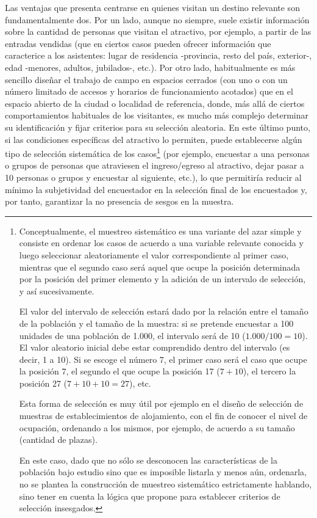 \documentclass[
]{book}
\begin{document}
Las ventajas que presenta centrarse en quienes visitan un destino relevante son fundamentalmente dos. Por un lado, aunque no siempre, suele existir información sobre la cantidad de personas que visitan el atractivo, por ejemplo, a partir de las entradas vendidas (que en ciertos casos pueden ofrecer información que caracterice a los asistentes: lugar de residencia -provincia, resto del país, exterior-, edad -menores, adultos, jubilados-, etc.). Por otro lado, habitualmente es más sencillo diseñar el trabajo de campo en espacios cerrados (con uno o con un número limitado de accesos y horarios de funcionamiento acotados) que en el espacio abierto de la ciudad o localidad de referencia, donde, más allá de ciertos comportamientos habituales de los visitantes, es mucho más complejo determinar su identificación y fijar criterios para su selección aleatoria. En este último punto, si las condiciones específicas del atractivo lo permiten, puede establecerse algún tipo de selección sistemática de los casos\footnote{Conceptualmente, el muestreo sistemático es una variante del azar simple y consiste en ordenar los casos de acuerdo a una variable relevante conocida y luego seleccionar aleatoriamente el valor correspondiente al primer caso, mientras que el segundo caso será aquel que ocupe la posición determinada por la posición del primer elemento y la adición de un intervalo de selección, y así sucesivamente.

  El valor del intervalo de selección estará dado por la relación entre el tamaño de la población y el tamaño de la muestra: si se pretende encuestar a 100 unidades de una población de 1.000, el intervalo será de 10 (\(1.000/100=10\)). El valor aleatorio inicial debe estar comprendido dentro del intervalo (es decir, 1 a 10). Si se escoge el número 7, el primer caso será el caso que ocupe la posición 7, el segundo el que ocupe la posición 17 (\(7+10\)), el tercero la posición 27 (\(7+10+10=27\)), etc.

  Esta forma de selección es muy útil por ejemplo en el diseño de selección de muestras de establecimientos de alojamiento, con el fin de conocer el nivel de ocupación, ordenando a los mismos, por ejemplo, de acuerdo a su tamaño (cantidad de plazas).

  En este caso, dado que no sólo se desconocen las características de la población bajo estudio sino que es imposible listarla y menos aún, ordenarla, no se plantea la construcción de muestreo sistemático estrictamente hablando, sino tener en cuenta la lógica que propone para establecer criterios de selección insesgados.} (por ejemplo, encuestar a una personas o grupos de personas que atraviesen el ingreso/egreso al atractivo, dejar pasar a 10 personas o grupos y encuestar al siguiente, etc.), lo que permitiría reducir al mínimo la subjetividad del encuestador en la selección final de los encuestados y, por tanto, garantizar la no presencia de sesgos en la muestra.\\
\end{document}
